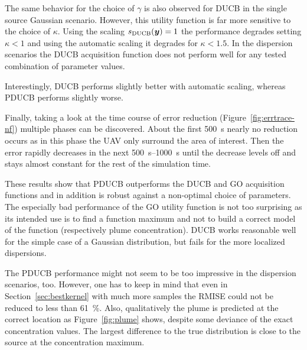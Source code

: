 The same behavior for the choice of $\gamma$ is also observed for DUCB in the 
single source Gaussian scenario. However, this utility function is far more 
sensitive to the choice of $\kappa$. Using the scaling $s_{\mathrm{DUCB}}(\bm{y}) = 1$ 
the performance degrades setting $\kappa < 1$ and using the automatic scaling it 
degrades for $\kappa < 1.5$. In the dispersion scenarios the DUCB acquisition 
function does not perform well for any tested combination of parameter values.

Interestingly,  DUCB performs slightly better with automatic scaling, whereas 
PDUCB performs slightly worse.

Finally, taking a look at the time course of error reduction 
(Figure~\ref{fig:errtrace-nf}) multiple phases can be discovered. About the 
first \SI{500}{\second} nearly no reduction occurs as in this phase the UAV only 
surround the area of interest. Then the error rapidly decreases in the next 
\SIrange{500}{1000}{\second} until the decrease levels off and stays almost 
constant for the rest of the simulation time.

These results show that PDUCB outperforms the DUCB and GO acquisition functions 
and in addition is robust against a non-optimal choice of parameters. The 
especially bad performance of the GO utility function is not too surprising as 
its intended use is to find a function maximum and not to build a correct model 
of the function (respectively plume concentration).  DUCB works reasonable well 
for the simple case of a Gaussian distribution, but fails for the more localized 
dispersions.

The PDUCB performance might not seem to be too impressive in the dispersion 
scenarios, too. However, one has to keep in mind that even in 
Section~\ref{sec:bestkernel} with much more samples the RMISE could not be 
reduced to less than \SI{61}{\percent}.  Also, qualitatively the plume is 
predicted at the correct location as Figure~\ref{fig:plume} shows, despite some 
deviance of the exact concentration values. The largest difference to the true 
distribution is close to the source at the concentration maximum.


